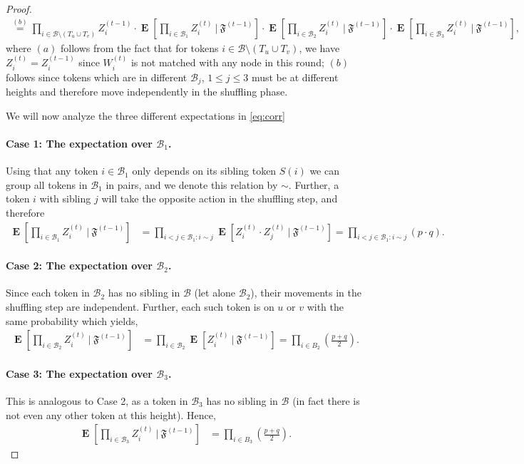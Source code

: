 \documentclass[twoside,leqno]{article}
\DeclareMathOperator{\E}{\mathbf{E}}
\newcommand{\B}{\mathcal{B}}
\DeclareMathOperator{\1}{\mathbf{1}}
\numberwithin{equation}{section}
\begin{document}
\begin{proof}
\begin{align}
\overset{(b)}{=} \prod_{i\in \B \setminus (T_u \cup T_v)}Z_i^{(t-1)}\cdot\E\left[\prod_{i\in \B_{1}} Z_i^{(t)}~\Bigg|~\mathfrak{F}^{(t-1)}\right] \cdot\E\left[\prod_{i\in \B_{2}} Z_i^{(t)}~\Bigg|~\mathfrak{F}^{(t-1)}\right]
\cdot \E\left[\prod_{i\in \B_{3}} Z_i^{(t)}~\Bigg|~\mathfrak{F}^{(t-1)}\right], \label{eq:corr}
\end{align}
where $(a)$ follows from the fact that for tokens $i\in \B \setminus (T_u\cup T_v)$, we have $Z_i^{(t)}=Z_i^{(t-1)}$ since $W_i^{(t)}$ is not matched with any node in this round; $(b)$ follows since tokens which are in different $\mathcal{B}_j$, $1 \leq j \leq 3$ must be at different heights and therefore move independently in the shuffling phase.

We will now analyze the three different expectations in \cref{eq:corr}
\paragraph{Case 1: The expectation over $\B_{1}$.}
Using that any token $i \in \mathcal{B}_1$ only depends on its sibling token $S(i)$ we can group all tokens in $\mathcal{B}_1$ in pairs, and we denote this relation by $\sim$. Further, a token $i$ with sibling $j$ will take the opposite action in the shuffling step, and therefore
\begin{align*}
    \E\left[\prod_{i\in \B_{1}} Z_i^{(t)}~\Bigg|~\mathfrak{F}^{(t-1)}\right]
    &=\prod_{i < j\in \B_{1} \colon i \sim j} \E\left[ Z_i^{(t)} \cdot Z_j^{(t)} ~\Bigg|~\mathfrak{F}^{(t-1)} \right] = \prod_{i < j\in \B_{1} \colon i \sim j} \left( p \cdot q \right).
\end{align*}

\paragraph{Case 2: The expectation over $\B_{2}$.} 
Since each token in $\B_{2}$ has no sibling in $\B$ (let alone $\B_2$), their movements in the shuffling step are independent. Further, each such token is on $u$ or $v$ with the same probability which yields,
\begin{align*}
    \E\left[\prod_{i\in \B_{2}} Z_i^{(t)}~\Bigg|~\mathfrak{F}^{(t-1)}\right]
    &=\prod_{i \in \B_2 } \E\left[ Z_i^{(t)}  ~\Bigg|~\mathfrak{F}^{(t-1)} \right] = \prod_{i \in B_2} \left( \frac{p+q}{2} \right).
\end{align*}

\paragraph{Case 3: The expectation over $\B_{3}$.} 
This is analogous to Case 2, as a token in $\B_{3}$ has no sibling in $\B$ (in fact there is not even any other token at this height). Hence,
\begin{align*}
 \E\left[\prod_{i\in \B_{3}} Z_i^{(t)}~\Bigg|~\mathfrak{F}^{(t-1)}\right]
    &= \prod_{i \in B_3} \left( \frac{p+q}{2} \right).
\end{align*}


\end{proof}
\end{document}
